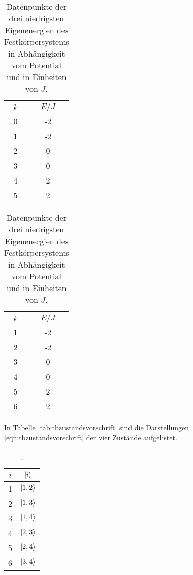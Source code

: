 \begin{table}[h]
  \centering
  \caption{Datenpunkte der drei niedrigsten Eigenenergien des Festkörpersystems in Abhängigkeit vom Potential und in Einheiten von $J$.}
  \begin{tabular}{S[table-format=1.0] S[table-format=2.0]}
    \toprule
    {$k$} & {$E/J$}\\
      & -2 \\
    1  & -2 \\
    2  & 0  \\
    3  & 0  \\
    4  & 2  \\
    5  & 2  \\
    \bottomrule
  \end{tabular}
  \label{tab:tbeigenwertee1}
\end{table}

\begin{table}[h]
  \centering
  \caption{Datenpunkte der drei niedrigsten Eigenenergien des Festkörpersystems in Abhängigkeit vom Potential und in Einheiten von $J$.}
  \begin{tabular}{S[table-format=1.0] S[table-format=2.0]}
    \toprule
    {$k$} & {$E/J$}\\
      & -2 \\
    2  & -2 \\
    3  & 0  \\
    4  & 0  \\
    5  & 2  \\
    6  & 2  \\
    \bottomrule
  \end{tabular}
  \label{tab:tbeigenwerte}
\end{table}




In Tabelle \ref{tab:tbzustandsvorschrift} sind die Darstellungen \eqref{eqn:tbzustandsvorschrift} der vier Zustände aufgelistet.

\begin{table}
  \centering
  \caption{.}
  \begin{tabular}{S[table-format=1.0] S}
    \toprule
    {$i$} & {$\ket{i}$} \\
     & $\ket{1,2}$ \\
    2 & $\ket{1,3}$ \\
    3 & $\ket{1,4}$ \\
    4 & $\ket{2,3}$ \\
    5 & $\ket{2,4}$ \\
    6 & $\ket{3,4}$ \\
    \midrule
  \end{tabular}
  \label{tab:hubbzustandsvorschrift}
\end{table}



